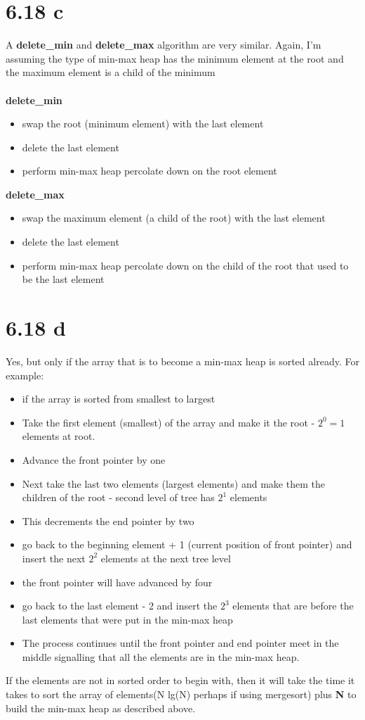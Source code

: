 \documentclass[12pt,letterpaper]{article}
\begin{document}
\section*{6.18 c}
A \textbf{delete\_min} and \textbf{delete\_max} algorithm are very similar. Again, I'm assuming the type of min-max heap has the minimum element at the root and the maximum element is a child of the minimum\\\\
\textbf{delete\_min}
\begin{itemize}
\item swap the root (minimum element) with the last element
\item delete the last element
\item perform min-max heap percolate down on the root element 
\end{itemize}
\textbf{delete\_max}
\begin{itemize}
\item swap the maximum element (a child of the root) with the last element
\item delete the last element
\item perform min-max heap percolate down on the child of the root that used to be the last element 
\end{itemize}
\section*{6.18 d}
Yes, but only if the array that is to become a min-max heap is sorted already. For example:\\
\begin{itemize}
\item if the array is sorted from smallest to largest
\item Take the first element (smallest) of the array and make it the root - $2^0 = 1$ elements at root.
\item Advance the front pointer by one
\item Next take the last two elements (largest elements) and make them the children of the root - second level of tree has $2^1$ elements
\item This decrements the end pointer by two
\item go back to the beginning element + 1 (current position of front pointer) and insert the next $2^2$ elements at the next tree level
\item the front pointer will have advanced by four
\item go back to the last element - 2 and insert the $2^3$ elements that are before the last elements that were put in the min-max heap
\item The process continues until the front pointer and end pointer meet in the middle signalling that all the elements are in the min-max heap.
\end{itemize}
If the elements are not in sorted order to begin with, then it will take the time it takes to sort the array of elements(N lg(N) perhaps if using mergesort) plus \textbf{N} to build the min-max heap as described above.
\end{document}

